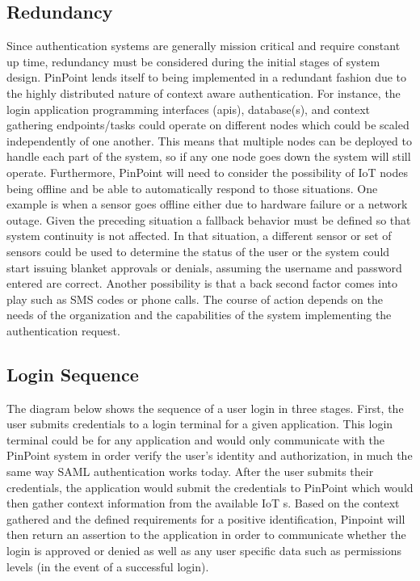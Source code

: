\documentclass[11pt,journal]{IEEEtran}
\begin{document}
\subsection{Redundancy}
Since authentication systems are generally mission critical and require constant up time, redundancy must be considered during the initial stages of system design.  PinPoint lends itself to being implemented in a redundant fashion due to the highly distributed nature of context aware authentication.  For instance, the login application programming interfaces (apis), database(s), and context gathering endpoints/tasks could operate on different nodes which could be scaled independently of one another.  This means that multiple nodes can be deployed to handle each part of the system, so if any one node goes down the system will still operate.  Furthermore, PinPoint will need to consider the possibility of IoT nodes being offline and be able to automatically respond to those situations.  One example is when a sensor goes offline either due to hardware failure or a network outage.  Given the preceding situation a fallback behavior must be defined so that system continuity is not affected.  In that situation, a different sensor or set of sensors could be used to determine the status of the user or the system could start issuing blanket approvals or denials, assuming the username and password entered are correct.  Another possibility is that a back second factor comes into play such as SMS codes or phone calls.  The course of action depends on the needs of the organization and the capabilities of the system implementing the authentication request.

\subsection{Login Sequence}
The diagram below shows the sequence of a user login in three stages.  First, the user submits credentials to a login terminal for a given application.  This login terminal could be for any application and would only communicate with the PinPoint system in order verify the user’s identity and authorization, in much the same way SAML authentication works today.  After the user submits their credentials, the application would submit the credentials to PinPoint which would then gather context information from the available IoT s.  Based on the context gathered and the defined requirements for a positive identification, Pinpoint will then return an assertion to the application in order to communicate whether the login is approved or denied as well as any user specific data such as permissions levels (in the event of a successful login).
\end{document}
